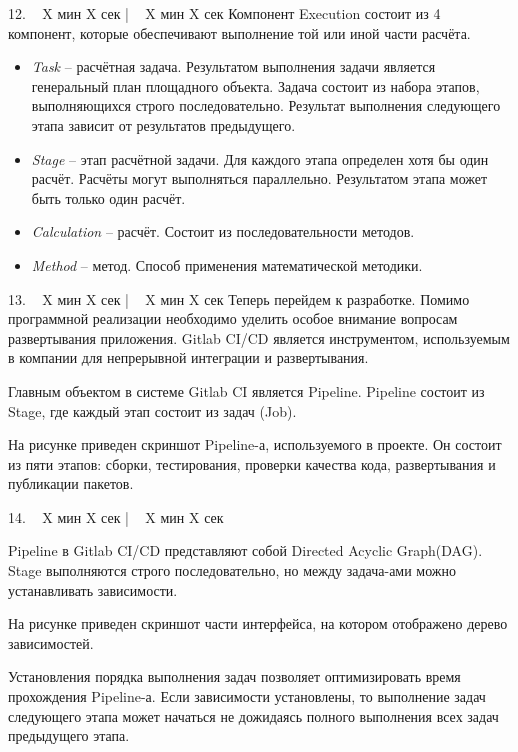 \documentclass[a4paper,14pt]{extarticle}
\begin{document}
    12. ~ X мин X сек | ~ X мин X сек
    Компонент Execution состоит из 4 компонент, которые обеспечивают выполнение той или иной части расчёта.

    \begin{itemize}
        \item {
            \textit{Task} -- расчётная задача.
            Результатом выполнения задачи является генеральный план площадного объекта.
            Задача состоит из набора этапов, выполняющихся строго последовательно.
            Результат выполнения следующего этапа зависит от результатов предыдущего.
        }
        \item {
            \textit{Stage} -- этап расчётной задачи.
            Для каждого этапа определен хотя бы один расчёт.
            Расчёты могут выполняться параллельно.
            Результатом этапа может быть только один расчёт.
        }
        \item {
            \textit{Calculation} -- расчёт. Состоит из последовательности методов.
        }
        \item {
            \textit{Method} -- метод. Способ применения математической методики.
        }
    \end{itemize}

    13. ~ X мин X сек | ~ X мин X сек
    Теперь перейдем к разработке.
    Помимо программной реализации необходимо уделить особое внимание вопросам развертывания приложения.
    Gitlab CI/CD является инструментом, используемым в компании для непрерывной интеграции и развертывания.

    Главным объектом в системе Gitlab CI является Pipeline.
    Pipeline состоит из Stage, где каждый этап состоит из задач (Job).

    На рисунке приведен скриншот Pipeline-а, используемого в проекте. Он состоит из пяти этапов:
    сборки, тестирования, проверки качества кода, развертывания и публикации пакетов.

    14. ~ X мин X сек | ~ X мин X сек

    Pipeline в Gitlab CI/CD представляют собой Directed Acyclic Graph(DAG).
    Stage выполняются строго последовательно, но между задача-ами можно устанавливать зависимости.

    На рисунке приведен скриншот части интерфейса, на котором отображено дерево зависимостей.

    Установления порядка выполнения задач позволяет оптимизировать время прохождения Pipeline-а.
    Если зависимости установлены, то выполнение задач следующего этапа может начаться не дожидаясь
    полного выполнения всех задач предыдущего этапа.
\end{document}
